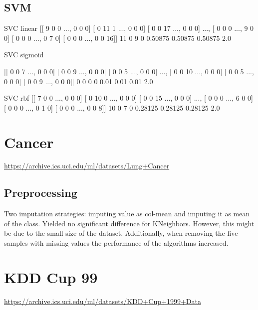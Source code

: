 \subsection{SVM}
SVC linear
[[ 9  0  0 ...,  0  0  0]
 [ 0 11  1 ...,  0  0  0]
 [ 0  0 17 ...,  0  0  0]
 ..., 
 [ 0  0  0 ...,  9  0  0]
 [ 0  0  0 ...,  0  7  0]
 [ 0  0  0 ...,  0  0 16]]
11 0 9 0
0.50875 0.50875 0.50875 2.0

SVC sigmoid

[[ 0  0  7 ...,  0  0  0]
 [ 0  0  9 ...,  0  0  0]
 [ 0  0  5 ...,  0  0  0]
 ..., 
 [ 0  0 10 ...,  0  0  0]
 [ 0  0  5 ...,  0  0  0]
 [ 0  0  9 ...,  0  0  0]]
0 0 0 0
0.01 0.01 0.01 2.0

SVC rbf
[[ 7  0  0 ...,  0  0  0]
 [ 0 10  0 ...,  0  0  0]
 [ 0  0 15 ...,  0  0  0]
 ..., 
 [ 0  0  0 ...,  6  0  0]
 [ 0  0  0 ...,  0  1  0]
 [ 0  0  0 ...,  0  0  8]]
10 0 7 0
0.28125 0.28125 0.28125 2.0

\section{Cancer}
\url{https://archive.ics.uci.edu/ml/datasets/Lung+Cancer}

\subsection{Preprocessing}
Two imputation strategies: imputing value as col-mean and imputing it as mean of the class. Yielded no significant difference for KNeighbors.
However, this might be due to the small size of the dataset. 
Additionally, when removing the five samples with missing values the performance of the algorithms increased. 

\section{KDD Cup 99}
\url{https://archive.ics.uci.edu/ml/datasets/KDD+Cup+1999+Data}
